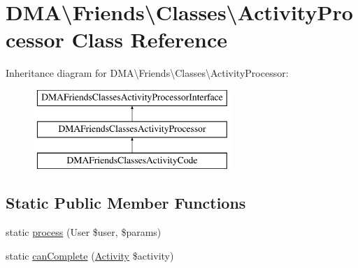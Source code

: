 \hypertarget{classDMA_1_1Friends_1_1Classes_1_1ActivityProcessor}{\section{D\-M\-A\textbackslash{}Friends\textbackslash{}Classes\textbackslash{}Activity\-Processor Class Reference}
\label{classDMA_1_1Friends_1_1Classes_1_1ActivityProcessor}
}
Inheritance diagram for D\-M\-A\textbackslash{}Friends\textbackslash{}Classes\textbackslash{}Activity\-Processor\-:\begin{figure}[H]
\begin{center}
\leavevmode
\includegraphics[height=3.000000cm]{db/d9c/classDMA_1_1Friends_1_1Classes_1_1ActivityProcessor}
\end{center}
\end{figure}
\subsection*{Static Public Member Functions}
\begin{DoxyCompactItemize}
\item 
static \hyperlink{classDMA_1_1Friends_1_1Classes_1_1ActivityProcessor_af892e6c3b63a5ef0002f97719839aa82}{process} (User \$user, \$params)
\item 
static \hyperlink{classDMA_1_1Friends_1_1Classes_1_1ActivityProcessor_adaddbe728558689c09abe18010c005e7}{can\-Complete} (\hyperlink{classDMA_1_1Friends_1_1Models_1_1Activity}{Activity} \$activity)
\end{DoxyCompactItemize}


